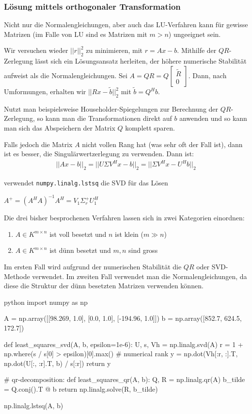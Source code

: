\subsubsection{Lösung mittels orthogonaler Transformation}
Nicht nur die Normalengleichungen, aber auch das LU-Verfahren kann für gewisse Matrizen (im Falle von LU sind es Matrizen mit $m > n$) ungeeignet sein.

Wir versuchen wieder $||r||_2^2$ zu minimieren, mit $r = Ax - b$.
Mithilfe der $QR$-Zerlegung lässt sich ein Lösungsansatz herleiten, der höhere numerische Stabilität aufweist als die Normalengleichungen.
Sei $A = QR = Q \begin{bmatrix}
        \tilde{R} \\ 0
    \end{bmatrix}$.
Dann, nach Umformungen, erhalten wir $||Rx - \tilde{b}||_2^2$ mit $\tilde{b} = Q^Hb$.

Nutzt man beispielsweise Householder-Spiegelungen zur Berechnung der $QR$-Zerlegung, so kann man die Transformationen direkt auf $b$ anwenden
und so kann man sich das Abspeichern der Matrix $Q$ komplett sparen.

Falls jedoch die Matrix $A$ nicht vollen Rang hat (was sehr oft der Fall ist), dann ist es besser, die Singulärwertzerlegung zu verwenden.
Dann ist:
\rmvspace
\begin{align*}
    ||Ax - b||_2 = ||U \Sigma V^H x - b||_2 = ||\Sigma V^H x - U^H b||_2
\end{align*}

\drmvspace
\innumpy verwendet \texttt{numpy.linalg.lstsq} die SVD für das Lösen

 $A^+ = (A^H A)^{-1} A^H = V_1 \Sigma_r^+ U_1^H$

Die drei bisher besprochenen Verfahren lassen sich in zwei Kategorien einordnen:
\begin{enumerate}
    \item $A \in K^{m \times n}$ ist voll besetzt und $n$ ist klein ($m \gg n$)
    \item $A \in K^{m \times n}$ ist dünn besetzt und $m, n$ sind gross
\end{enumerate}
Im ersten Fall wird aufgrund der numerischen Stabilität die $QR$ oder SVD-Methode verwendet.
Im zweiten Fall verwendet man die Normalengleichungen, da diese die Struktur der dünn besetzten Matrizen verwenden können.

\begin{code}{python}
import numpy as np

A = np.array([[98.269, 1.0], [0.0, 1.0], [-194.96, 1.0]])
b = np.array([852.7, 624.5, 172.7])

def least_squares_svd(A, b, epsilon=1e-6):
    U, s, Vh = np.linalg.svd(A)
    r = 1 + np.where(s / s[0] > epsilon)[0].max()  # numerical rank
    y = np.dot(Vh[:r, :].T, np.dot(U[:, :r].T, b) / s[:r])
    return y

# qr-decomposition:
def least_squares_qr(A, b):
    Q, R = np.linalg.qr(A)
    b_tilde = Q.conj().T @ b
    return np.linalg.solve(R, b_tilde)

np.linalg.lstsq(A, b)
\end{code}
